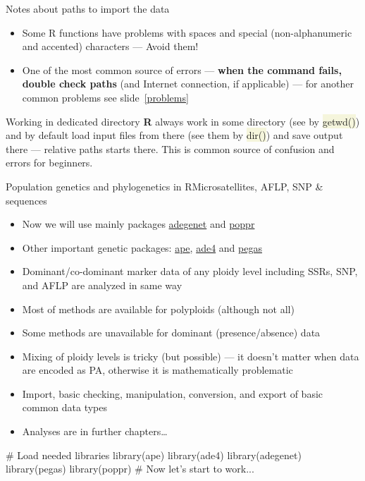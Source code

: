 \documentclass[compress, xelatex, 11pt, xcolor=svgnames, aspectratio=169,
	hyperref={
		bookmarks=true,
		unicode=true,
		colorlinks=true,
		pdftitle={Molecular data in R},
		plainpages=false,
		pdfauthor={Vojtech Zeisek},
		pdfsubject={Course about phylogeny and evolution in R},
		pdfcreator={XeLaTeX},
		pdfkeywords={R, evolution, phylogeny, molecular data},
		linkcolor=Crimson, %
		anchorcolor=Magenta, %
		citecolor=Magenta, %
		filecolor=Magenta, %
		menucolor=Magenta, %
		urlcolor=DodgerBlue, %
		},
	url={hyphens, lowtilde} %
	]{beamer}
\renewcommand{\texttt}[1]{\colorbox{Beige}{{\ttfamily #1}}}
\begin{document}
\begin{frame}[allowframebreaks]{Notes about paths to import the data}
\begin{itemize}
\begin{itemize}
		\end{itemize}
		\item Some R functions have problems with spaces and special (non-alphanumeric and accented) characters --- Avoid them!
		\item One of the most common source of errors --- \textbf{when the command fails, double check paths} (and Internet connection, if applicable) --- for another common problems see slide~\ref{problems}
	\end{itemize}
	\begin{alertblock}{Working in dedicated directory}
		\textbf{R} always work in some directory (see by \texttt{getwd()}) and by default load input files from there (see them by \texttt{dir()}) and save output there --- relative paths starts there. This is common source of confusion and errors for beginners.
	\end{alertblock}
\end{frame}

\begin{frame}[fragile]{Population genetics and phylogenetics in R}{Microsatellites, AFLP, SNP \& sequences}
	\begin{multicols}{2}
		\begin{itemize}
			\item Now we will use mainly packages \href{https://adegenet.r-forge.r-project.org/}{adegenet} and \href{https://grunwaldlab.github.io/poppr/}{poppr}
			\item Other important genetic packages: \href{http://ape-package.ird.fr/}{ape}, \href{https://sdray.github.io/software/}{ade4} and \href{http://ape-package.ird.fr/pegas.html}{pegas}
			\item Dominant/co-dominant marker data of any ploidy level including SSRs, SNP, and AFLP are analyzed in same way
			\item Most of methods are available for polyploids (although not all)
			\item Some methods are unavailable for dominant (presence/absence) data
			\item Mixing of ploidy levels is tricky (but possible) --- it doesn't matter when data are encoded as PA, otherwise it is mathematically problematic
			\item Import, basic checking, manipulation, conversion, and export of basic common data types
			\item Analyses are in further chapters\ldots
		\end{itemize}
		\begin{spluscode}
    # Load needed libraries
    library(ape)
    library(ade4)
    library(adegenet)
    library(pegas)
    library(poppr)
    # Now let's start to work...
		\end{spluscode}
	\end{multicols}
\end{frame}
\end{document}
